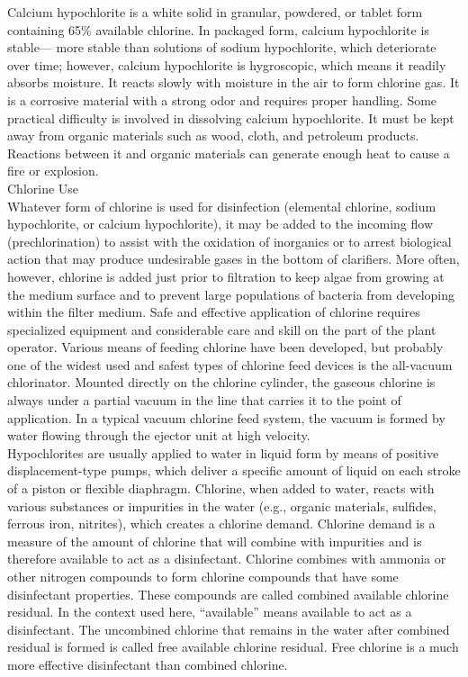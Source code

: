 \documentclass{article}
\begin{document}
Calcium hypochlorite is a white solid in granular, powdered, or tablet form containing 65\% available chlorine. In packaged form, calcium hypochlorite is stable— more stable than solutions of sodium hypochlorite, which deteriorate over time; however, calcium hypochlorite is hygroscopic, which means it readily absorbs moisture. It reacts slowly with moisture in the air to form chlorine gas. It is a corrosive material with a strong odor and requires proper handling. Some practical difficulty is involved in dissolving calcium hypochlorite. It must be kept away from organic materials such as wood, cloth, and petroleum products. Reactions between it and organic materials can generate enough heat to cause a fire or explosion.\\

Chlorine Use\\
Whatever form of chlorine is used for disinfection (elemental chlorine, sodium hypochlorite, or calcium hypochlorite), it may be added to the incoming flow (prechlorination) to assist with the oxidation of inorganics or to arrest biological action that may produce undesirable gases in the bottom of clarifiers. More often, however, chlorine is added just prior to filtration to keep algae from growing at the medium surface and to prevent large populations of bacteria from developing within the filter medium. Safe and effective application of chlorine requires specialized equipment and considerable care and skill on the part of the plant operator. Various means of feeding chlorine have been developed, but probably one of the widest used and safest types of chlorine feed devices is the all-vacuum chlorinator. Mounted directly on the chlorine cylinder, the gaseous chlorine is always under a partial vacuum in the line that carries it to the point of application. In a typical vacuum chlorine feed system, the vacuum is formed by water flowing through the ejector unit at high velocity.\\
Hypochlorites are usually applied to water in liquid form by means of positive displacement-type pumps, which deliver a specific amount of liquid on each stroke of a piston or flexible diaphragm. Chlorine, when added to water, reacts with various substances or impurities in the water (e.g., organic materials, sulfides, ferrous iron, nitrites), which creates a chlorine demand. Chlorine demand is a measure of the amount of chlorine that will combine with impurities and is therefore available to act as a disinfectant. Chlorine combines with ammonia or other nitrogen compounds to form chlorine compounds that have some disinfectant properties. These compounds are called combined available chlorine residual. In the context used here, “available” means available to act as a disinfectant. The uncombined chlorine that remains in the water after combined residual is formed is called free available chlorine residual. Free chlorine is a much more effective disinfectant than combined chlorine.\\
\end{document}
